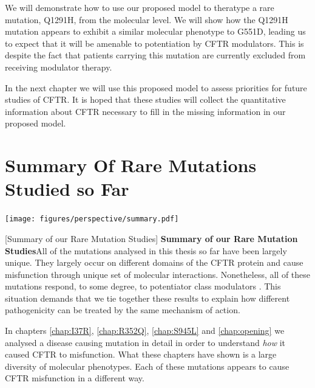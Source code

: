 We will demonstrate how to use our proposed model to theratype a rare mutation, Q1291H, from the molecular level. We will show how the Q1291H mutation appears to exhibit a similar molecular phenotype to G551D, leading us to expect that it will be amenable to potentiation by CFTR modulators. This is despite the fact that patients carrying this mutation are currently excluded from receiving modulator therapy. 

In the next chapter we will use this proposed model to assess priorities for future studies of CFTR. It is hoped that these studies will collect the quantitative information about CFTR necessary to fill in the missing information in our proposed model. 



\section{Summary Of Rare Mutations Studied so Far}

	\begin{center}
		\texttt{[image: figures/perspective/summary.pdf]}
	\end{center}
\begingroup
\captionsetup{singlelinecheck = false, justification=raggedright}
[Summary of our Rare Mutation Studies] {\textbf{Summary of our Rare Mutation Studies}}{All of the mutations analysed in this thesis so far have been largely unique. They largely occur on different domains of the CFTR protein and cause misfunction through unique set of molecular interactions. Nonetheless, all of these mutations respond, to some degree, to potentiator class modulators \cite{wong2022, wong2022a, kim2018, vanwilligen2019}. This situation demands that we tie together these results to explain how different pathogenicity can be treated by the same mechanism of action. } 
\endgroup

In chapters \ref{chap:I37R}, \ref{chap:R352Q}, \ref{chap:S945L} and \ref{chap:opening} we analysed a disease causing mutation in detail in order to understand \textit{how} it caused CFTR to misfunction. What these chapters have shown is a large diversity of molecular phenotypes. Each of these mutations appears to cause CFTR misfunction in a different way. 

